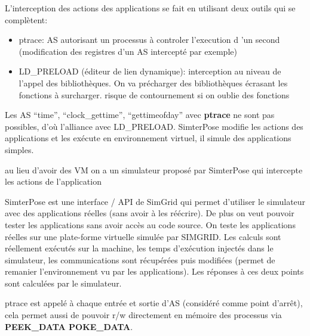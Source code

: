\documentclass{article}
\begin{document}
L'interception des actions des applications se fait en utilisant deux
outils qui se complètent:
\begin{itemize}
\item ptrace: AS autorisant un processus à controler l'execution d 'un
  second (modification des registres d'un AS intercepté par exemple)
\item LD\_PRELOAD (éditeur de lien dynamique): interception au niveau
  de l'appel des bibliothèques. On va précharger des bibliothèques
  écrasant les fonctions à surcharger. {\color{red} risque de
    contournement si on oublie des fonctions}
\end{itemize}

Les AS ``time'', ``clock\_gettime'', ``gettimeofday'' avec
\textbf{ptrace} ne sont pas possibles, d'où l'alliance avec
LD\_PRELOAD.  SimterPose modifie les actions des applications et les
exécute en environnement virtuel, il simule des applications simples.

{\color{green} au lieu d'avoir des VM on a un simulateur proposé par
  SimterPose qui intercepte les actions de l'application}

SimterPose est une interface / API de SimGrid qui permet d'utiliser le
simulateur avec des applications réelles (sans avoir à les
réécrire). De plus on veut pouvoir tester les applications sans avoir
accès au code source. On teste les applications réelles sur une
plate-forme virtuelle simulée par SIMGRID. Les calculs sont réellement
exécutés sur la machine, les temps d'exécution injectés dans le
simulateur, les communications sont récupérées puis modifiées (permet
de remanier l'environnement vu par les applications). Les réponses à
ces deux points sont calculées par le simulateur.

ptrace est appelé à chaque entrée et sortie d'AS (considéré comme
point d'arrêt), cela permet aussi de pouvoir r/w directement en
mémoire des processus via \textbf{PEEK\_DATA POKE\_DATA}.
\end{document}
